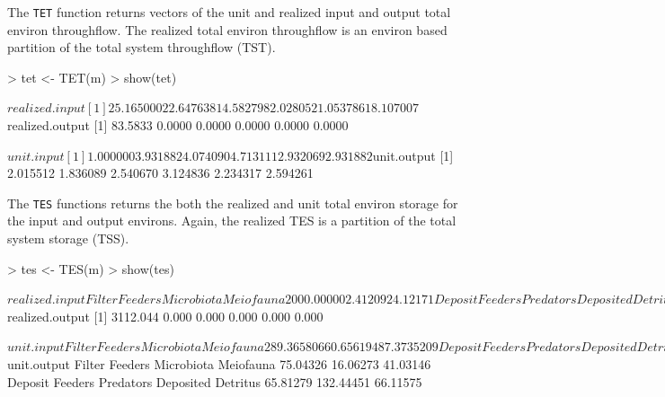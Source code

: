 \documentclass[11pt]{article}
\begin{document}
The \texttt{TET} function returns vectors of the unit and realized
input and output total environ throughflow.  The realized total
environ throughflow is an environ based partition of the total system
throughflow (TST). 

\begin{Schunk}
\begin{Sinput}
> tet <- TET(m)
> show(tet)
\end{Sinput}
\begin{Soutput}
$realized.input
[1] 25.165000 22.647638 14.582798  2.028052  1.053786 18.107007

$realized.output
[1] 83.5833  0.0000  0.0000  0.0000  0.0000  0.0000

$unit.input
[1] 1.000000 3.931882 4.074090 4.713111 2.932069 2.931882

$unit.output
[1] 2.015512 1.836089 2.540670 3.124836 2.234317 2.594261
\end{Soutput}
\end{Schunk}

The \texttt{TES} functions returns the both the realized and unit
total environ storage for the input and output environs.  Again, the
realized TES is a partition of the total system storage (TSS).   

\begin{Schunk}
\begin{Sinput}
> tes <- TES(m)
> show(tes)
\end{Sinput}
\begin{Soutput}
$realized.input
    Filter Feeders         Microbiota          Meiofauna 
        2000.00000            2.41209           24.12171 
   Deposit Feeders          Predators Deposited Detritus 
          16.27440           69.23803         1000.03118 

$realized.output
[1] 3112.044    0.000    0.000    0.000    0.000    0.000

$unit.input
    Filter Feeders         Microbiota          Meiofauna 
       289.3658066          0.6561948          7.3735209 
   Deposit Feeders          Predators Deposited Detritus 
        11.5308112        109.7205293        265.1036470 

$unit.output
    Filter Feeders         Microbiota          Meiofauna 
          75.04326           16.06273           41.03146 
   Deposit Feeders          Predators Deposited Detritus 
          65.81279          132.44451           66.11575 
\end{Soutput}
\end{Schunk}
\end{document}
